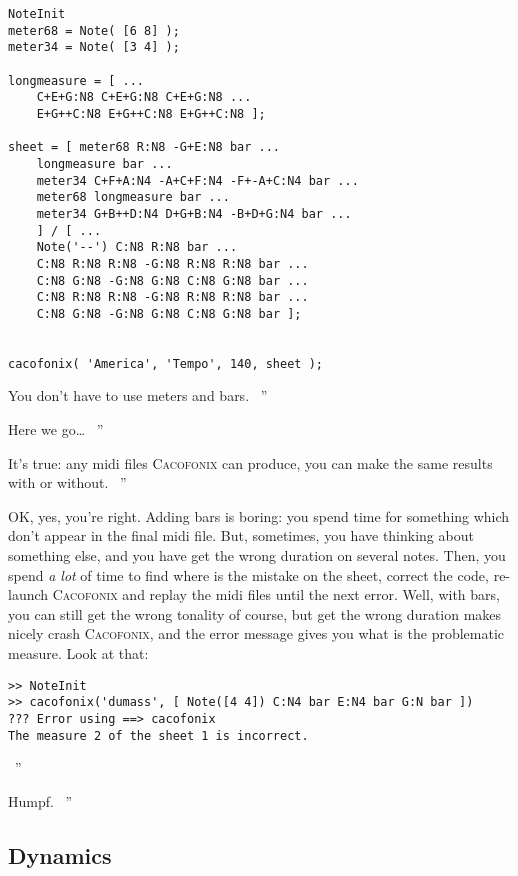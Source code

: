 \documentclass{article}
\newcommand\cacofonix{\textsc{Cacofonix}\xspace}
\newenvironment{meenv}{ \par \noindent \makebox[6em][r]{ \textcolor{mecolor}{Me}: `` --~}}{~''}
\newenvironment{myselfenv}{ \par \noindent \makebox[6em][r]{ \textcolor{myselfcolor}{Myself}: `` --~}}{~''}
\newcommand{ \me }[1]{%
\begin{meenv}%
	#1%
\end{meenv} }
\newcommand{ \myself }[1]{%
\begin{myselfenv}%
	#1%
\end{myselfenv} }
\begin{document}
\begin{lstlisting}
NoteInit
meter68 = Note( [6 8] );
meter34 = Note( [3 4] );

longmeasure = [ ...
	C+E+G:N8 C+E+G:N8 C+E+G:N8 ...
	E+G++C:N8 E+G++C:N8 E+G++C:N8 ];

sheet = [ meter68 R:N8 -G+E:N8 bar ...
	longmeasure bar ...
	meter34 C+F+A:N4 -A+C+F:N4 -F+-A+C:N4 bar ...
	meter68 longmeasure bar ...
	meter34 G+B++D:N4 D+G+B:N4 -B+D+G:N4 bar ...
	] / [ ...
	Note('--') C:N8 R:N8 bar ...
	C:N8 R:N8 R:N8 -G:N8 R:N8 R:N8 bar ...
	C:N8 G:N8 -G:N8 G:N8 C:N8 G:N8 bar ...
	C:N8 R:N8 R:N8 -G:N8 R:N8 R:N8 bar ...
	C:N8 G:N8 -G:N8 G:N8 C:N8 G:N8 bar ];
	

cacofonix( 'America', 'Tempo', 140, sheet );
\end{lstlisting}

\me{You don't have to use meters and bars.}
\myself{Here we go\dots}
\me{It's true: any midi files \cacofonix can produce, you can make the same results with or without.}
\begin{myselfenv}%
	OK, yes, you're right. Adding bars is boring: you spend time for something which don't appear in the final midi file. But, sometimes, you have thinking about something else, and you have get the wrong duration on several notes. Then, you spend \emph{a lot} of time to find where is the mistake on the sheet, correct the code, re-launch \cacofonix and replay the midi files until the next error. Well, with bars, you can still get the wrong tonality of course, but get the wrong duration makes nicely crash \cacofonix, and the error message gives you what is the problematic measure. Look at that:
\begin{lstlisting}
>> NoteInit
>> cacofonix('dumass', [ Note([4 4]) C:N4 bar E:N4 bar G:N bar ])
??? Error using ==> cacofonix
The measure 2 of the sheet 1 is incorrect.
\end{lstlisting}%
\end{myselfenv}
\me{Humpf.}

\subsection{Dynamics}
\label{sec:Dynamics}
\end{document}
